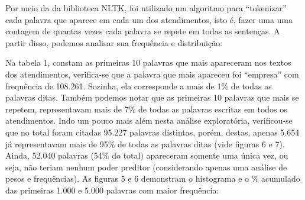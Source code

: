 \documentclass[twocolumn]{rbef}
\newcommand{\1}{\mathbbm{1}}
\begin{document}
\newline\linebreak Por meio da da biblioteca NLTK, foi utilizado um algoritmo para “tokenizar” cada palavra que aparece em cada um dos atendimentos, isto é, fazer uma uma contagem de quantas vezes cada palavra se repete em todas as sentenças. A partir disso, podemos analisar sua frequência e distribuição:
\begin{table}[!htb]
\caption{Frequência das primeiras 10 palavras}
\end{table}
\newline\linebreak Na tabela 1, constam as primeiras 10 palavras que mais apareceram nos textos dos atendimentos, verifica-se que a palavra que mais apareceu foi “empresa” com frequência de 108.261. Sozinha, ela corresponde a mais de 1\% de todas as palavras ditas. Também podemos notar que as primeiras 10 palavras que mais se repetem, representavam mais de 7\% de todas as palavras escritas em todos os atendimentos. Indo um pouco mais além nesta análise exploratória, verificou-se que no total foram citadas 95.227 palavras distintas, porém, destas, apenas 5.654 já representavam mais de 95\% de todas as palavras ditas (vide figuras 6 e 7). Ainda, 52.040 palavras (54\% do total) apareceram somente uma única vez, ou seja, não teriam nenhum poder preditor (considerando apenas uma análise de pesos e frequências). As figuras 5 e 6 demonstram o histograma e o \% acumulado das primeiras 1.000 e 5.000 palavras com maior frequência:
\end{document}
